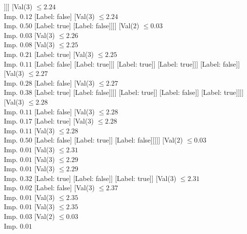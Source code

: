 \documentclass[margin=10pt]{standalone}
\begin{document}
\begin{forest}
																				]]]
																	[Val($3$) $ \leq 2.24$ \\ Imp. $0.12$
																		[Label: false]
																		[Val($3$) $ \leq 2.24$ \\ Imp. $0.50$
																			[Label: true]
																			[Label: false]]]]
																[Val($2$) $ \leq 0.03$ \\ Imp. $0.03$
																	[Val($3$) $ \leq 2.26$ \\ Imp. $0.08$
																		[Val($3$) $ \leq 2.25$ \\ Imp. $0.21$
																			[Label: true]
																			[Val($3$) $ \leq 2.25$ \\ Imp. $0.11$
																				[Label: false]
																				[Label: true]]]
																		[Label: true]]
																	[Label: true]]]
															[Label: false]]
														[Val($3$) $ \leq 2.27$ \\ Imp. $0.28$
															[Label: false]
															[Val($3$) $ \leq 2.27$ \\ Imp. $0.38$
																[Label: true]
																[Label: false]]]]
													[Label: true]]
												[Label: false]]
											[Label: true]]]]
								[Val($3$) $ \leq 2.28$ \\ Imp. $0.11$
									[Label: false]
									[Val($3$) $ \leq 2.28$ \\ Imp. $0.17$
										[Label: true]
										[Val($3$) $ \leq 2.28$ \\ Imp. $0.11$
											[Val($3$) $ \leq 2.28$ \\ Imp. $0.50$
												[Label: false]
												[Label: true]]
											[Label: false]]]]]
							[Val($2$) $ \leq 0.03$ \\ Imp. $0.01$
								[Val($3$) $ \leq 2.31$ \\ Imp. $0.01$
									[Val($3$) $ \leq 2.29$ \\ Imp. $0.01$
										[Val($3$) $ \leq 2.29$ \\ Imp. $0.32$
											[Label: true]
											[Label: false]]
										[Label: true]]
									[Val($3$) $ \leq 2.31$ \\ Imp. $0.02$
										[Label: false]
										[Val($3$) $ \leq 2.37$ \\ Imp. $0.01$
											[Val($3$) $ \leq 2.35$ \\ Imp. $0.01$
												[Val($3$) $ \leq 2.35$ \\ Imp. $0.03$
													[Val($2$) $ \leq 0.03$ \\ Imp. $0.01$

\end{forest}
\end{document}
